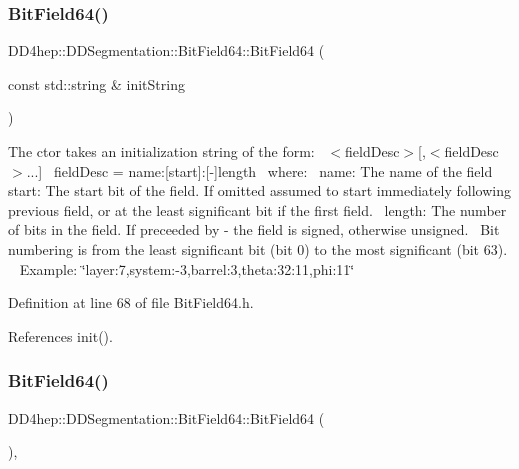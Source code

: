 \subsubsection{\texorpdfstring{Bit\+Field64()}{BitField64()}\hspace{0.1cm}{\footnotesize\ttfamily [1/2]}}
{\footnotesize\ttfamily D\+D4hep\+::\+D\+D\+Segmentation\+::\+Bit\+Field64\+::\+Bit\+Field64 (\begin{DoxyParamCaption}\item[{const std\+::string \&}]{init\+String }\end{DoxyParamCaption})\hspace{0.3cm}{\ttfamily [inline]}}

The c\textquotesingle{}tor takes an initialization string of the form\+:~\newline
 $<$field\+Desc$>$\mbox{[},$<$field\+Desc$>$...\mbox{]}~\newline
 field\+Desc = name\+:\mbox{[}start\mbox{]}\+:\mbox{[}-\/\mbox{]}length~\newline
 where\+:~\newline
 name\+: The name of the field~\newline
 start\+: The start bit of the field. If omitted assumed to start immediately following previous field, or at the least significant bit if the first field.~\newline
 length\+: The number of bits in the field. If preceeded by \textquotesingle{}-\/\textquotesingle{} the field is signed, otherwise unsigned.~\newline
 Bit numbering is from the least significant bit (bit 0) to the most significant (bit 63). ~\newline
 Example\+: \char`\"{}layer\+:7,system\+:-\/3,barrel\+:3,theta\+:32\+:11,phi\+:11\char`\"{} 

Definition at line 68 of file Bit\+Field64.\+h.



References init().

\hypertarget{class_d_d4hep_1_1_d_d_segmentation_1_1_bit_field64_a16079b52f710e962e5f3630f236383d6}{}\label{class_d_d4hep_1_1_d_d_segmentation_1_1_bit_field64_a16079b52f710e962e5f3630f236383d6} 
\subsubsection{\texorpdfstring{Bit\+Field64()}{BitField64()}\hspace{0.1cm}{\footnotesize\ttfamily [2/2]}}
{\footnotesize\ttfamily D\+D4hep\+::\+D\+D\+Segmentation\+::\+Bit\+Field64\+::\+Bit\+Field64 (\begin{DoxyParamCaption}{ }\end{DoxyParamCaption})\hspace{0.3cm}{\ttfamily [inline]}, {\ttfamily [protected]}}

